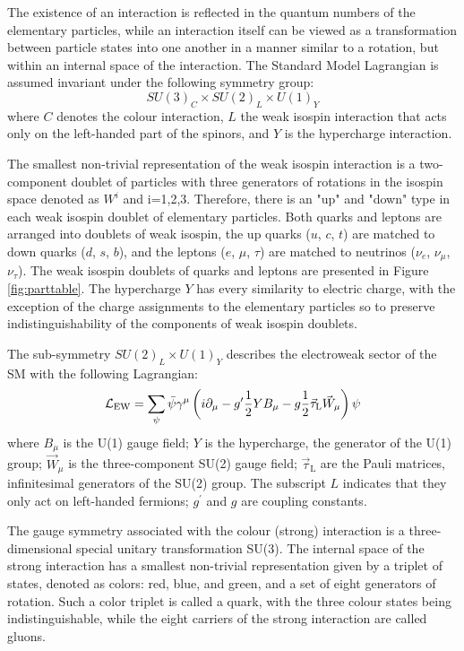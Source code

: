 The existence of an interaction is reflected in the quantum numbers of the elementary
particles, while an interaction itself can be viewed as a transformation between particle states
into one another in a manner similar to a rotation, but within an internal space of the interaction.
The Standard Model Lagrangian is assumed invariant under the following symmetry group:
\begin{equation}
SU(3)_C \times SU(2)_L \times U(1)_Y
\label{eqn:symSM}
\end{equation}
where $C$ denotes the colour interaction, $L$ the weak isospin interaction 
that acts only on the left-handed part of the spinors, and $Y$ is the hypercharge
interaction.

The smallest non-trivial representation of the weak isospin interaction is
a two-component doublet of particles with three generators
of rotations in the isospin space denoted as $W^i$ and i=1,2,3.
Therefore, there is an "up" and "down" type in each weak isospin doublet of elementary particles.
Both quarks and leptons are arranged into doublets of weak isospin, the up quarks ($u$, $c$, $t$)
are matched to down quarks ($d$, $s$, $b$), and the leptons ($e$, $\mu$, $\tau$) are matched
to neutrinos ($\nu_e$, $\nu_{\mu}$, $\nu_{\tau}$). The weak isospin doublets of quarks and leptons
are presented in Figure \ref{fig:parttable}.  
The hypercharge $Y$ has every similarity to electric charge, with the exception of the
charge assignments to the elementary particles so to preserve indistinguishability of the components
of weak isospin doublets.

The sub-symmetry $SU(2)_L \times U(1)_Y$ describes the electroweak sector of the SM with the 
following Lagrangian:
\begin{equation}
\mathcal{L}_\mathrm{EW} = \sum_\psi\bar\psi\gamma^\mu \left(i\partial_\mu-g^\prime{1\over2}YB_\mu-g{1\over2}\vec\tau_\mathrm{L}\vec W_\mu\right)\psi
\label{eqn:LagrEWK}
\end{equation}
where $B_{\mu}$ is the U(1) gauge field; $Y$ is the hypercharge, the generator of 
the U(1) group; $\vec{W}_\mu$ is the three-component SU(2) gauge field; $\vec{\tau}_\mathrm{L}$
 are the Pauli matrices, infinitesimal generators of the SU(2) group. 
The subscript $L$ indicates that they only act on left-handed fermions; $g^{'}$ and $g$
 are coupling constants.



The gauge symmetry associated with the colour (strong) interaction is a three-dimensional special
unitary transformation SU(3). The internal space of the strong interaction has a smallest
non-trivial representation given by a triplet of states, denoted as colors: red, blue, and green,
and a set of eight generators of rotation. Such a color triplet is called a quark, with the
three colour states being indistinguishable, while the
eight carriers of the strong interaction are called gluons. 



